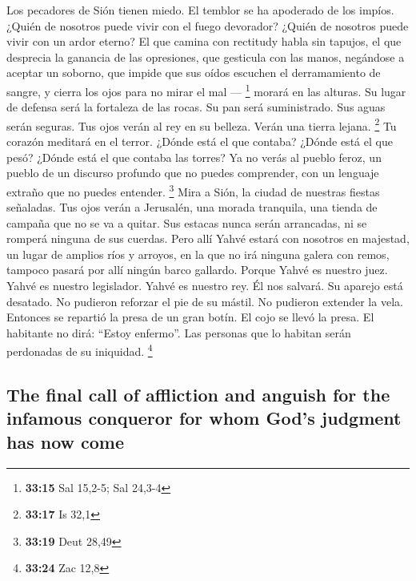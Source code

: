 \begin{paracol}{2}
 Los pecadores de Sión tienen miedo. El temblor se ha
apoderado de los impíos. ¿Quién de nosotros puede vivir con el fuego
devorador? ¿Quién de nosotros puede vivir con un ardor eterno?
 El que camina con rectitudy habla sin tapujos, el que
desprecia la ganancia de las opresiones, que gesticula con las manos,
negándose a aceptar un soborno, que impide que sus oídos escuchen el
derramamiento de sangre, y cierra los ojos para no mirar el mal ---
\footnote{\textbf{33:15} Sal 15,2-5; Sal 24,3-4}  morará
en las alturas. Su lugar de defensa será la fortaleza de las rocas. Su
pan será suministrado. Sus aguas serán seguras.  Tus ojos
verán al rey en su belleza. Verán una tierra lejana. \footnote{\textbf{33:17}
  Is 32,1}  Tu corazón meditará en el terror. ¿Dónde está
el que contaba? ¿Dónde está el que pesó? ¿Dónde está el que contaba las
torres?  Ya no verás al pueblo feroz, un pueblo de un
discurso profundo que no puedes comprender, con un lenguaje extraño que
no puedes entender. \footnote{\textbf{33:19} Deut 28,49} 
Mira a Sión, la ciudad de nuestras fiestas señaladas. Tus ojos verán a
Jerusalén, una morada tranquila, una tienda de campaña que no se va a
quitar. Sus estacas nunca serán arrancadas, ni se romperá ninguna de sus
cuerdas.  Pero allí Yahvé estará con nosotros en
majestad, un lugar de amplios ríos y arroyos, en la que no irá ninguna
galera con remos, tampoco pasará por allí ningún barco gallardo.
 Porque Yahvé es nuestro juez. Yahvé es nuestro
legislador. Yahvé es nuestro rey. Él nos salvará.  Su
aparejo está desatado. No pudieron reforzar el pie de su mástil. No
pudieron extender la vela. Entonces se repartió la presa de un gran
botín. El cojo se llevó la presa.  El habitante no dirá:
``Estoy enfermo''. Las personas que lo habitan serán perdonadas de su
iniquidad. \footnote{\textbf{33:24} Zac 12,8}

\switchcolumn
\begin{otherlanguage}{english}

\hypertarget{the-final-call-of-affliction-and-anguish-for-the-infamous-conqueror-for-whom-gods-judgment-has-now-come}{%
\subsection{The final call of affliction and anguish for the infamous
conqueror for whom God's judgment has now
come}\label{the-final-call-of-affliction-and-anguish-for-the-infamous-conqueror-for-whom-gods-judgment-has-now-come}}


\end{otherlanguage}
\end{paracol}
